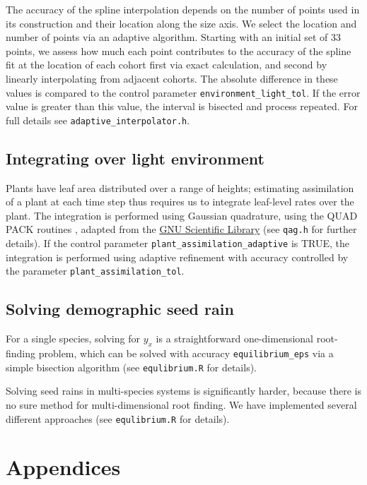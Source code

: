 \documentclass[10pt,twoside]{article}
\begin{document}
The accuracy of the spline interpolation depends on the number of points
used in its construction and their location along the size axis. We
select the location and number of points via an adaptive algorithm.
Starting with an initial set of 33 points, we assess how much each point
contributes to the accuracy of the spline fit at the location of each
cohort first via exact calculation, and second by linearly interpolating
from adjacent cohorts. The absolute difference in these values is
compared to the control parameter \texttt{environment\_light\_tol}. If
the error value is greater than this value, the interval is bisected and
process repeated. For full details see
\texttt{adaptive\_interpolator.h}.

\subsection{Integrating over light
environment}\label{integrating-over-light-environment}

Plants have leaf area distributed over a range of heights; estimating
assimilation of a plant at each time step thus requires us to integrate
leaf-level rates over the plant. The integration is performed using
Gaussian quadrature, using the QUAD PACK routines \citep{Piessens-1983},
adapted from the \href{http://www.gnu.org/software/gsl/}{GNU Scientific
Library}\citep{Galassi-2009} (see \texttt{qag.h} for further details).
If the control parameter \texttt{plant\_assimilation\_adaptive} is TRUE,
the integration is performed using adaptive refinement with accuracy
controlled by the parameter \texttt{plant\_assimilation\_tol}.

\subsection{Solving demographic seed
rain}\label{solving-demographic-seed-rain}

For a single species, solving for \(y_x\) is a straightforward
one-dimensional root-finding problem, which can be solved with accuracy
\texttt{equilibrium\_eps} via a simple bisection algorithm (see 
\texttt{equlibrium.R} for details). 

Solving seed rains in multi-species systems is significantly harder,
because there is no sure method for multi-dimensional root finding. We
have implemented several different approaches (see 
\texttt{equlibrium.R} for details).

\section{Appendices}\label{appendices}
\end{document}
